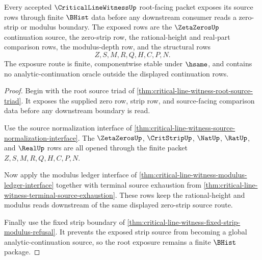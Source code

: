 \begin{theorem}
\label{thm:critical-line-witness-root-source-exposure}
Every accepted $\CriticalLineWitnessUp$ root-facing packet exposes its source rows through finite $\BHist$ data before any downstream consumer reads a zero-strip or modulus boundary. The exposed rows are the $\ZetaZerosUp$ continuation source, the zero-strip row, the rational-height and real-part comparison rows, the modulus-depth row, and the structural rows
$$
Z,S,M,R,Q,H,C,P,N.
$$
The exposure route is finite, componentwise stable under $\hsame$, and contains no analytic-continuation oracle outside the displayed continuation rows.
\end{theorem}
\begin{proof}
Begin with the root source triad of \autoref{thm:critical-line-witness-root-source-triad}. It exposes the supplied zero row, strip row, and source-facing comparison data before any downstream boundary is read.

Use the source normalization interface of \autoref{thm:critical-line-witness-source-normalization-interface}. The $\ZetaZerosUp$, $\CritStripUp$, $\NatUp$, $\RatUp$, and $\RealUp$ rows are all opened through the finite packet $Z,S,M,R,Q,H,C,P,N$.

Now apply the modulus ledger interface of \autoref{thm:critical-line-witness-modulus-ledger-interface} together with terminal source exhaustion from \autoref{thm:critical-line-witness-terminal-source-exhaustion}. These rows keep the rational-height and modulus reads downstream of the same displayed zero-strip source route.

Finally use the fixed strip boundary of \autoref{thm:critical-line-witness-fixed-strip-modulus-refusal}. It prevents the exposed strip source from becoming a global analytic-continuation source, so the root exposure remains a finite $\BHist$ package.
\end{proof}

